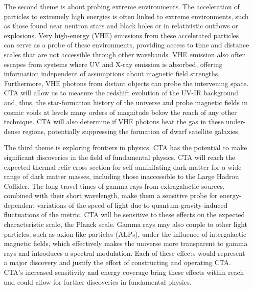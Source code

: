 The second theme is about probing extreme environments. The acceleration of particles to extremely high energies is often linked to extreme environments, such as those found near neutron stars and black holes or in relativistic outflows or explosions. Very high-energy (VHE) emissions from these accelerated particles can serve as a probe of these environments, providing access to time and distance scales that are not accessible through other wavebands. VHE emission also often escapes from systems where UV and X-ray emission is absorbed, offering information independent of assumptions about magnetic field strengths. Furthermore, VHE photons from distant objects can probe the intervening space. CTA will allow us to measure the redshift evolution of the UV-IR background and, thus, the star-formation history of the universe and probe magnetic fields in cosmic voids at levels many orders of magnitude below the reach of any other technique. CTA will also determine if VHE photons heat the gas in these under-dense regions, potentially suppressing the formation of dwarf satellite galaxies.

The third theme is exploring frontiers in physics. CTA has the potential to make significant discoveries in the field of fundamental physics. CTA will reach the expected thermal relic cross-section for self-annihilating dark matter for a wide range of dark matter masses, including those inaccessible to the Large Hadron Collider. The long travel times of gamma rays from extragalactic sources, combined with their short wavelength, make them a sensitive probe for energy-dependent variations of the speed of light due to quantum-gravity-induced fluctuations of the metric. CTA will be sensitive to these effects on the expected characteristic scale, the Planck scale. Gamma rays may also couple to other light particles, such as axion-like particles (ALPs), under the influence of intergalactic magnetic fields, which effectively makes the universe more transparent to gamma rays and introduces a spectral modulation. Each of these effects would represent a major discovery and justify the effort of constructing and operating CTA. CTA's increased sensitivity and energy coverage bring these effects within reach and could allow for further discoveries in fundamental physics.


